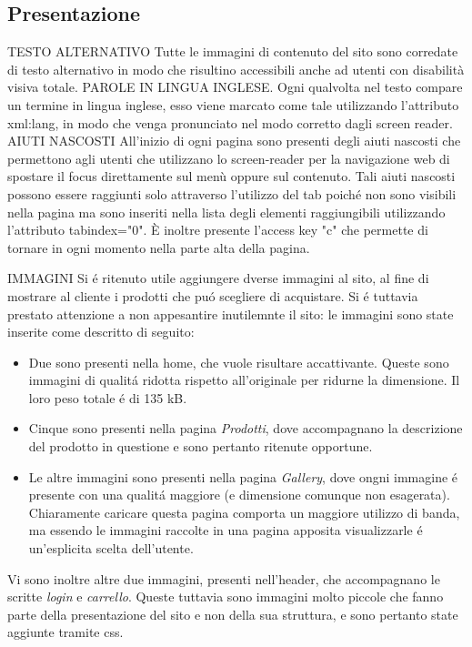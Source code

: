    \subsection{Presentazione}
		TESTO ALTERNATIVO
		Tutte le immagini di contenuto del sito sono corredate di testo alternativo in modo che risultino accessibili anche ad utenti con disabilità visiva totale.
		PAROLE IN LINGUA INGLESE.
		Ogni qualvolta nel testo compare un termine in lingua inglese, esso viene marcato come tale utilizzando l'attributo xml:lang, in modo che venga pronunciato nel modo corretto dagli screen reader.
		AIUTI NASCOSTI
		All'inizio di ogni pagina sono presenti degli aiuti nascosti che permettono agli utenti che utilizzano lo screen-reader per la navigazione web di spostare il focus direttamente sul menù oppure sul contenuto.
		Tali aiuti nascosti possono essere raggiunti solo attraverso l'utilizzo del tab poiché non sono visibili nella pagina ma sono inseriti nella lista degli elementi raggiungibili utilizzando l'attributo tabindex="0".
		È inoltre presente l'access key "c" che permette di tornare in ogni momento nella parte alta della pagina.

		IMMAGINI
		Si \'e ritenuto utile aggiungere dverse immagini al sito, al fine di mostrare al cliente i prodotti che pu\'o scegliere di acquistare.
		Si \'e tuttavia prestato attenzione a non appesantire inutilemnte il sito: le immagini sono state inserite come descritto di seguito:
		\begin{itemize}
		\item Due sono presenti nella home, che vuole risultare accattivante. Queste sono immagini di qualit\'a ridotta rispetto all'originale per ridurne la dimensione. Il loro peso totale \'e di 135 kB.
		\item Cinque sono presenti nella pagina \emph{Prodotti}, dove accompagnano la descrizione del prodotto in questione e sono pertanto ritenute opportune.
		\item Le altre immagini sono presenti nella pagina \emph{Gallery}, dove ongni immagine \'e presente con una qualit\'a maggiore (e dimensione comunque non esagerata). Chiaramente caricare questa pagina comporta un maggiore utilizzo di banda, ma essendo le immagini raccolte in una pagina apposita visualizzarle \'e un'esplicita scelta dell'utente.
		\end{itemize}
		Vi sono inoltre altre due immagini, presenti nell'header, che accompagnano le scritte \emph{login} e \emph{carrello}.
		Queste tuttavia sono immagini molto piccole che fanno parte della presentazione del sito e non della sua struttura, e sono pertanto state aggiunte tramite css.


